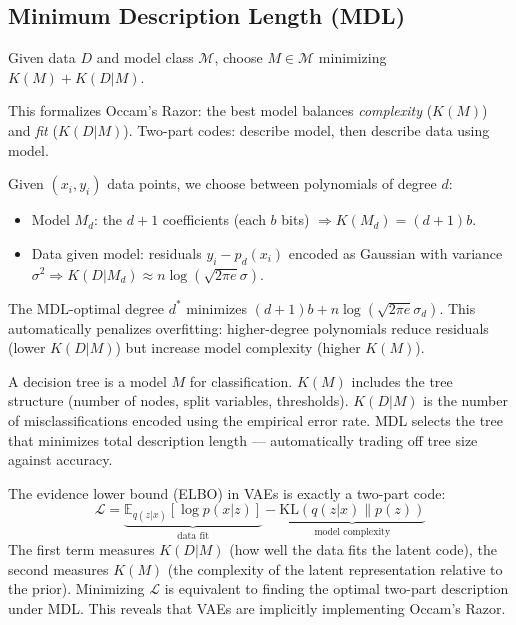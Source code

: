 \subsection{Minimum Description Length (MDL)}
\label{sec:kolmogorov:mdl}

\begin{theorem}
Given data $D$ and model class $\mathcal{M}$, choose $M \in \mathcal{M}$ minimizing $K(M) + K(D|M)$.
\end{theorem}

This formalizes Occam's Razor: the best model balances \emph{complexity} ($K(M)$) and \emph{fit} ($K(D|M)$). Two-part codes: describe model, then describe data using model.

\begin{example}
Given $(x_i, y_i)$ data points, we choose between polynomials of degree $d$:
\begin{itemize}
\item Model $M_d$: the $d+1$ coefficients (each $b$ bits) $\Rightarrow K(M_d) = (d+1)b$.
\item Data given model: residuals $y_i - p_d(x_i)$ encoded as Gaussian with variance $\sigma^2 \Rightarrow K(D|M_d) \approx n \log(\sqrt{2\pi e}\sigma)$.
\end{itemize}
The MDL-optimal degree $d^*$ minimizes $(d+1)b + n\log(\sqrt{2\pi e}\sigma_d)$. This automatically penalizes overfitting: higher-degree polynomials reduce residuals (lower $K(D|M)$) but increase model complexity (higher $K(M)$).
\end{example}

\begin{example}
A decision tree is a model $M$ for classification. $K(M)$ includes the tree structure (number of nodes, split variables, thresholds). $K(D|M)$ is the number of misclassifications encoded using the empirical error rate. MDL selects the tree that minimizes total description length --- automatically trading off tree size against accuracy.
\end{example}

\begin{example}
The evidence lower bound (ELBO) in VAEs is exactly a two-part code:
\[
\mathcal{L} = \underbrace{\mathbb{E}_{q(z|x)}[\log p(x|z)]}_{\text{data fit}} - \underbrace{\text{KL}(q(z|x) \| p(z))}_{\text{model complexity}}
\]
The first term measures $K(D|M)$ (how well the data fits the latent code), the second measures $K(M)$ (the complexity of the latent representation relative to the prior). Minimizing $\mathcal{L}$ is equivalent to finding the optimal two-part description under MDL. This reveals that VAEs are implicitly implementing Occam's Razor.
\end{example}

